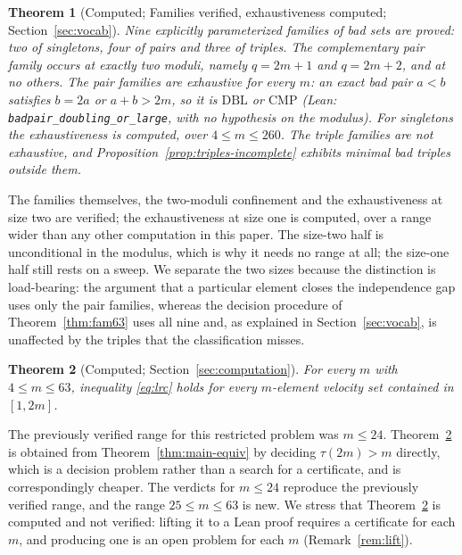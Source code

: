 \documentclass[11pt]{amsart}
\theoremstyle{plain}
\newtheorem{theorem}{Theorem}[section]
\theoremstyle{definition}
\begin{document}
\begin{theorem}[Computed; Families verified, exhaustiveness computed; Section~\ref{sec:vocab}]\label{thm:main-vocab}
Nine explicitly parameterized families of bad sets are proved: two of singletons, four of pairs and
three of triples. The complementary pair family occurs at exactly two moduli, namely $q = 2m+1$ and
$q = 2m+2$, and at no others. The pair families are exhaustive for \emph{every} $m$: an exact bad
pair $a<b$ satisfies $b = 2a$ or $a+b > 2m$, so it is $\mathrm{DBL}$ or $\mathrm{CMP}$ (Lean:
\texttt{badpair\_doubling\_or\_large}, with no hypothesis on the modulus). For singletons the
exhaustiveness is computed, over $4 \le m \le 260$. The triple families are
\emph{not} exhaustive, and Proposition~\ref{prop:triples-incomplete} exhibits minimal bad triples
outside them.
\end{theorem}

The families themselves, the two-moduli confinement and the exhaustiveness at size two are
verified; the exhaustiveness at size one is computed, over a range wider than any other computation
in this paper. The size-two half is unconditional in the modulus, which is why it needs no range at
all; the size-one half still rests on a sweep. We separate the two sizes because the distinction is
load-bearing: the argument that a particular element closes
the independence gap uses only the pair families, whereas the decision procedure of
Theorem~\ref{thm:fam63} uses all nine and, as explained in Section~\ref{sec:vocab}, is unaffected by
the triples that the classification misses.

\begin{theorem}[Computed; Section~\ref{sec:computation}]\label{thm:main-63}
For every $m$ with $4 \le m \le 63$, inequality \eqref{eq:lrc} holds for every $m$-element velocity
set contained in $[1,2m]$.
\end{theorem}

The previously verified range for this restricted problem was $m \le 24$. Theorem~\ref{thm:main-63}
is obtained from Theorem~\ref{thm:main-equiv} by deciding $\tau(2m) > m$ directly, which is a
decision problem rather than a search for a certificate, and is correspondingly cheaper. The
verdicts for $m \le 24$ reproduce the previously verified range, and the range $25 \le m \le 63$ is
new. We stress that Theorem~\ref{thm:main-63} is computed and not verified: lifting it to a Lean
proof requires a certificate for each $m$, and producing one is an open problem for each $m$
(Remark~\ref{rem:lift}).
\end{document}

